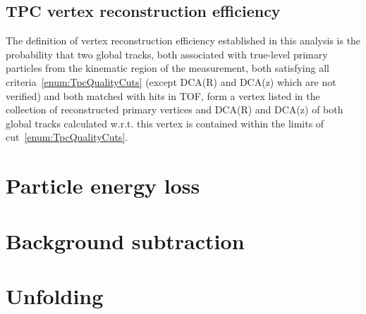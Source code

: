 \subsection{TPC vertex reconstruction efficiency}\label{sec:tpcVxRecoEff}

The definition of vertex reconstruction efficiency established in this analysis is the probability that two global tracks, both associated with true-level primary particles from the kinematic region of the measurement, both satisfying all criteria~\ref{enum:TpcQualityCuts} (except DCA(R) and DCA(z) which are not verified) and both matched with hits in TOF, form a vertex listed in the collection of reconstructed primary vertices and DCA(R) and DCA(z) of both global tracks calculated w.r.t. this vertex is contained within the limits of cut~\ref{enum:TpcQualityCuts}.

\section{Particle energy loss}\label{sec:energyLoss}
\section{Background subtraction}\label{sec:bkgdSubtraction}
\section{Unfolding}\label{sec:unfolding}

% 
% 
% 
% 
% 
% 
% 
% 
